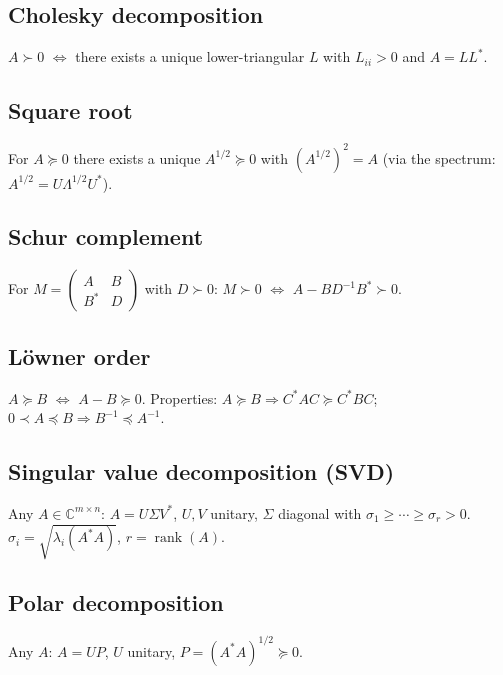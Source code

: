 \subsection{Cholesky decomposition}
\label{subsec:cholesky}

$A\succ0$ $\iff$ there exists a unique lower-triangular $L$ with $L_{ii}>0$ and $A=LL^*$.

\subsection{Square root}
\label{subsec:square-root}

For $A\succeq0$ there exists a unique $A^{1/2}\succeq0$ with $(A^{1/2})^2=A$ (via the spectrum: $A^{1/2}=U\Lambda^{1/2}U^*$).

\subsection{Schur complement}
\label{subsec:schur-complement}

For $M=\begin{pmatrix}A&B\\ B^*&D\end{pmatrix}$ with $D\succ0$: $M\succ0$ $\iff$ $A-BD^{-1}B^*\succ0$.

\subsection{L\"owner order}
\label{subsec:loewner-order}

$A\succeq B$ $\iff$ $A-B\succeq0$. Properties: $A\succeq B\Rightarrow C^*AC\succeq C^*BC$; $0\prec A\preceq B\Rightarrow B^{-1}\preceq A^{-1}$.

\subsection{Singular value decomposition (SVD)}
\label{subsec:svd}

Any $A\in\mathbb{C}^{m\times n}$: $A=U\Sigma V^*$, $U,V$ unitary, $\Sigma$ diagonal with $\sigma_1\ge\cdots\ge\sigma_r>0$. $\sigma_i=\sqrt{\lambda_i(A^*A)}$, $r=\operatorname{rank}(A)$.

\subsection{Polar decomposition}
\label{subsec:polar}

Any $A$: $A=UP$, $U$ unitary, $P=(A^*A)^{1/2}\succeq0$.

